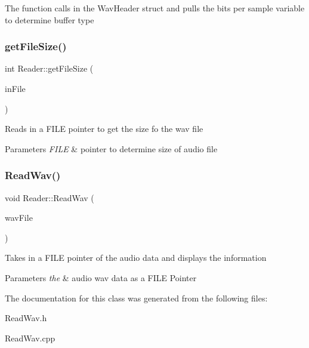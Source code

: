 The function calls in the Wav\+Header struct and pulls the bits per sample variable to determine buffer type \mbox{\label{classReader_a26e7eb6fabd4424304d00658907a4878}} 
\subsubsection{\texorpdfstring{get\+File\+Size()}{getFileSize()}}
{\footnotesize\ttfamily int Reader\+::get\+File\+Size (\begin{DoxyParamCaption}\item[{F\+I\+LE $\ast$}]{in\+File }\end{DoxyParamCaption})}

Reads in a F\+I\+LE pointer to get the size fo the wav file 
\begin{DoxyParams}{Parameters}
{\em F\+I\+LE} & pointer to determine size of audio file \\
\hline
\end{DoxyParams}
\mbox{\label{classReader_aa33ad038bf60829bd30149a5b8436bb2}} 
\subsubsection{\texorpdfstring{Read\+Wav()}{ReadWav()}}
{\footnotesize\ttfamily void Reader\+::\+Read\+Wav (\begin{DoxyParamCaption}\item[{F\+I\+LE $\ast$}]{wav\+File }\end{DoxyParamCaption})}

Takes in a F\+I\+LE pointer of the audio data and displays the information 
\begin{DoxyParams}{Parameters}
{\em the} & audio wav data as a F\+I\+LE Pointer \\
\hline
\end{DoxyParams}


The documentation for this class was generated from the following files\+:\begin{DoxyCompactItemize}
\item 
Read\+Wav.\+h\item 
Read\+Wav.\+cpp\end{DoxyCompactItemize}
